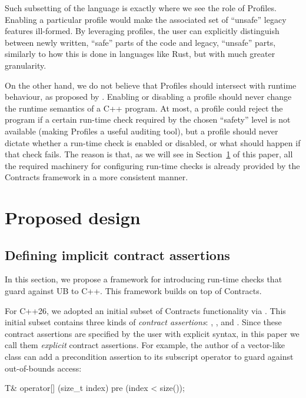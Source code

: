 Such subsetting of the language is exactly where we see the role of Profiles. Enabling a particular profile would make the associated set of ``unsafe'' legacy features ill-formed. By leveraging profiles, the user can explicitly distinguish between newly written, ``safe'' parts of the code and legacy, ``unsafe'' parts, similarly to how this is done in languages like Rust, but with much greater granularity.

On the other hand, we do not believe that Profiles should intersect with runtime behaviour, as proposed by  \cite{P3081R1}. Enabling or disabling a profile should never change the runtime semantics of a C++ program. %
At most, a profile could reject the program if a certain run-time check required by the chosen ``safety'' level is not available (making Profiles a useful auditing tool), but a profile should never dictate whether a run-time check is enabled or disabled, or what should happen if that check fails. The reason is that, as we will see in Section~\ref{design} of this paper, all the required machinery for configuring run-time checks is already provided by the Contracts framework in a more consistent manner.

\section{Proposed design}
\label{design}

\subsection{Defining implicit contract assertions}
\label{defineicas}

In this section, we propose a framework for introducing run-time checks that guard against UB to C++. This framework builds on top of Contracts.

For C++26, we adopted an initial subset of Contracts functionality via \cite{P2900R14}. This initial subset contains three kinds of \emph{contract assertions}: , , and . Since these contract assertions are specified by the user with explicit syntax, in this paper we call them \emph{explicit} contract assertions. For example, the author of a vector-like class can add a precondition assertion to its subscript operator to guard against out-of-bounds access:

\begin{codeblock}
T& operator[] (size_t index)
  pre (index < size());
\end{codeblock}

